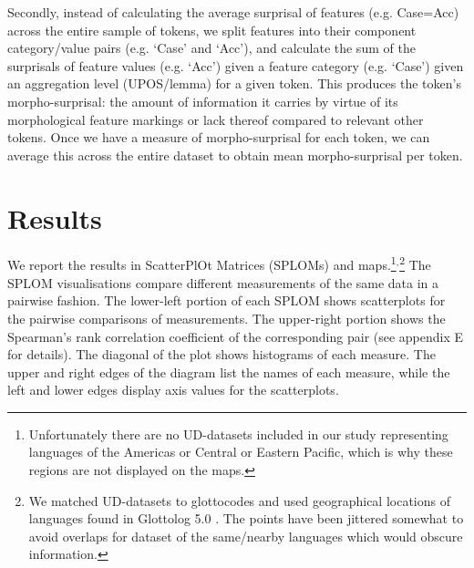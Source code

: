 \documentclass[USenglish]{article}
\begin{document}
Secondly, instead of calculating the average surprisal of features (e.g. Case=Acc) across the entire sample of tokens, we split features into their component category/value pairs (e.g. `Case' and `Acc'), and calculate the sum of the surprisals of feature values (e.g. `Acc') given a feature category (e.g. `Case') given an aggregation level (UPOS/lemma) for a given token.
This produces the token's morpho-surprisal: the amount of information it carries by virtue of its morphological feature markings or lack thereof compared to relevant other tokens.
Once we have a measure of morpho-surprisal for each token, we can average this across the entire dataset to obtain mean morpho-surprisal per token.

\section{Results}\label{sec:results}
We report the results in ScatterPlOt Matrices (SPLOMs) and maps.\footnote{Unfortunately there are no UD-datasets included in our study representing languages of the Americas or Central or Eastern Pacific, which is why these regions are not displayed on the maps.}$^{,}$\footnote{We matched UD-datasets to glottocodes and used geographical locations of languages found in Glottolog 5.0 \citep{hammarstrom_glottologglottolog_2024}. The points have been jittered somewhat to avoid overlaps for dataset of the same/nearby languages which would obscure information.}
The SPLOM visualisations compare different measurements of the same data in a  pairwise fashion.
The lower-left portion of each SPLOM shows scatterplots for the pairwise comparisons of measurements.
The upper-right portion shows the Spearman's rank correlation coefficient of the corresponding pair (see appendix E
for details). 
The diagonal of the plot shows histograms of each measure. 
The upper and right edges of the diagram list the names of each measure, while the left and lower edges display axis values for the scatterplots.
\end{document}
